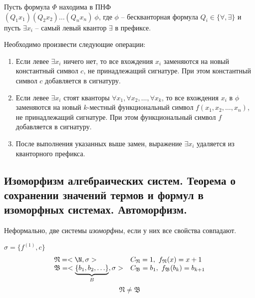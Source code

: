 \begin{note}[Сколемизация]
    Пусть формула $ \Phi $ находима в ПНФ \\$ (Q_1 x_1)(Q_2x_2)\ldots(Q_nx_n) \ \phi $, где $ \phi $ -- бескванторная формула $ Q_i \in \{\forall,\exists\} $ и пусть $ \exists x_i $ -- самый левый квантор $ \exists $ в префиксе.

    Необходимо произвести следующие операции:
    \begin{enumerate}
        \item Если левее $ \exists x_i $ ничего нет, то все вхождения $ x_i $ заменяются на новый константный символ $ c $, не принадлежащий сигнатуре. При этом константный символ $ c $ добавляется в сигнатуру.
        \item Если левее $ \exists x_i $ стоят кванторы $ \forall x_1, \forall x_2, \ldots, \forall x_k $, то все вхождения $ x_i $ в $ \phi $ заменяются на новый $ k $-местный функциональный символ $ f(x_1,x_2,\ldots,x_n) $, не принадлежащий сигнатуре. При этом функциональный символ $ f $ добавляется в сигнатуру.
        \item После выполнения указанных выше замен, выражение $ \exists x_i $ удаляется из кванторного префикса.
    \end{enumerate}
\end{note}

\subsection{Изоморфизм алгебраических систем. Теорема о сохранении значений термов и формул в изоморфных системах. Автоморфизм.}

\begin{note}
    Неформально, две системы \emph{изоморфны}, если у них все свойства совпадают.
\end{note}

\begin{example}
    $ \sigma = \{f^{(1)},c\} $
    \[
        \begin{array}{ll}
            \mathfrak{N} = <\N,\sigma>                                  & C_\mathfrak{N} = 1, \ f_\mathfrak{N}(x) = x+1         \\
            \mathfrak{B} = <\underbrace{\{b_1,b_2,\ldots\}}_{B},\sigma> & C_\mathfrak{B} = b_1, \ f_\mathfrak{B}(b_k) = b_{k+1}
        \end{array}
    \]
    \[
        \mathfrak{N}\ne\mathfrak{B}
    \]
\end{example}

